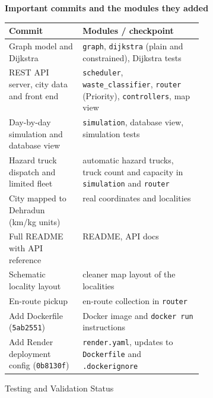 \documentclass[12pt,a4paper]{article}
\renewcommand{\arraystretch}{1}
\newcommand{\sectiontitle}[1]{%
    {\color{GEUBlue}
    \fontsize{18}{22}\selectfont #1}
}
\begin{document}
{\vspace{3mm}
\textbf{Important commits and the modules they added}

\vspace{1mm}
{\fontsize{10}{12.5}\selectfont
\renewcommand{\arraystretch}{1.15}
\begin{tabularx}{\linewidth}{@{}>{\raggedright\arraybackslash}p{0.38\linewidth}>{\raggedright\arraybackslash}X@{}}
\hline
\textbf{Commit} & \textbf{Modules / checkpoint}\\
\hline
Graph model and Dijkstra & \texttt{graph}, \texttt{dijkstra} (plain and constrained), Dijkstra tests\\
REST API server, city data and front end & \texttt{scheduler}, \texttt{waste\_classifier}, \texttt{router} (Priority), \texttt{controllers}, map view\\
Day-by-day simulation and database view & \texttt{simulation}, database view, simulation tests\\
Hazard truck dispatch and limited fleet & automatic hazard trucks, truck count and capacity in \texttt{simulation} and \texttt{router}\\
City mapped to Dehradun (km/kg units) & real coordinates and localities\\
Full README with API reference & README, API docs\\
Schematic locality layout & cleaner map layout of the localities\\
En-route pickup & en-route collection in \texttt{router}\\
Add Dockerfile (\texttt{5ab2551}) & Docker image and \texttt{docker run} instructions\\
Add Render deployment config (\texttt{0b8130f}) & \texttt{render.yaml}, updates to \texttt{Dockerfile} and \texttt{.dockerignore}\\
\hline
\end{tabularx}}}

\newpage


\vspace*{0.20cm}

\sectiontitle{Testing and Validation Status}

\vspace{0.30cm}
\end{document}

